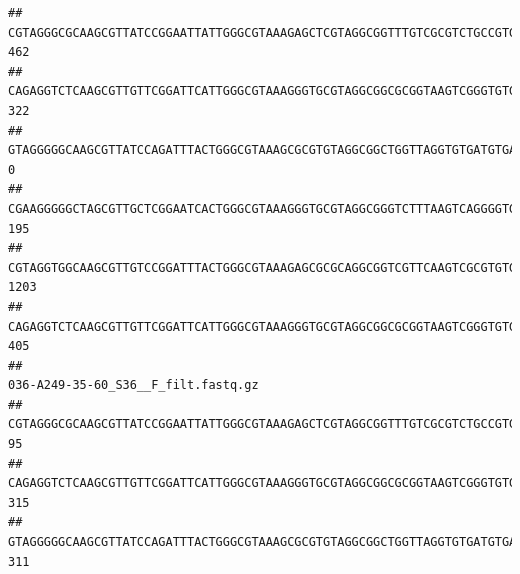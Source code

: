 \documentclass[]{article}
\begin{document}
\begin{verbatim}
## CGTAGGGCGCAAGCGTTATCCGGAATTATTGGGCGTAAAGAGCTCGTAGGCGGTTTGTCGCGTCTGCCGTGAAAGTCCGGGGCTCAACTCCGGATCTGCGGTGGGTACGGGCAGACTAGAGTGATGTAGGGGAGACTGGAATTCCTGGTGTAGCGGTGAAATGCGCAGATATCAGGAGGAACACCGATGGCGAAGGCAGGTCTCTGGGCATTAACTGACGCTGAGGAGCGAAAGCATGGGGAGCGAACA                                462
## CAGAGGTCTCAAGCGTTGTTCGGATTCATTGGGCGTAAAGGGTGCGTAGGCGGCGCGGTAAGTCGGGTGTGAAATCTCGGAGCTTAACTCCGAAACTGCATTCGATACTGCCGTGCTTGAGGACTGGAGAGGAGACTGGAATTTACGGTGTAGCGGTGAAATGCGTAGATATCGTAAGGAAGACCAGTGGCGAAGGCGGGTCTCTGGACAGTTCCTGACGCTGAGGCACGAAGGCCAGGGGAGCAAACG                                322
## GTAGGGGGCAAGCGTTATCCAGATTTACTGGGCGTAAAGCGCGTGTAGGCGGCTGGTTAGGTGTGATGTGAAATCTTCCGGCTCAACCGGAAAACTGCATTGCAAACCGGCCTGGCTAGAGTGCAGGAGAGGGAAGCGGAATTCCAGGTGTAGCGGTGAAATGCGTAGATATCTGGAGGAACACCAGTGGCGAAGGCGGCTTCCTGGCCTGCAACTGACGCTGAGACGCGAAAGCGTGGGGAGCGAAC                                   0
## CGAAGGGGGCTAGCGTTGCTCGGAATCACTGGGCGTAAAGGGTGCGTAGGCGGGTCTTTAAGTCAGGGGTGAAATCCTGGAGCTCAACTCCAGAACTGCCTTTGATACTGAAGATCTTGAGTTCGGGAGAGGTGAGTGGAACTGCGAGTGTAGAGGTGAAATTCGTAGATATTCGCAAGAACACCAGTGGCGAAGGCGGCTCACTGGCCCGATACTGACGCTGAGGCACGAAAGCGTGGGGAGCAAACA                                195
## CGTAGGTGGCAAGCGTTGTCCGGATTTACTGGGCGTAAAGAGCGCGCAGGCGGTCGTTCAAGTCGCGTGTGAAAGCCCCCGGCTCAACTGGGGAGGGTCACGCGATACTGATCGACTCGAAGGCAGGAGAGGGTAGTGGAATTCCCGGTGTAGTGGTGAAATGCGTAGATATCGGGAGGAACACCAGTGGCGAAGGCGACTACCTGGCCTGTTCTTGACGCTGAGGCGCGAAAGCTAGGGGAGCAAACG                               1203
## CAGAGGTCTCAAGCGTTGTTCGGATTCATTGGGCGTAAAGGGTGCGTAGGCGGCGCGGTAAGTCGGGTGTGAAATCTCGGGGCTTAACTCCGAAACTGCATTCGATACTGCCGTGCTTGAGGACTGGAGAGGAGACTGGAATTTACGGTGTAGCGGTGAAATGCGTAGATATCGTAAGGAAGACCAGTGGCGAAGGCGGGTCTCTGGACAGTTCCTGACGCTGAGGCACGAAGGCCAGGGGAGCAAACG                                405
##                                                                                                                                                                                                                                                           036-A249-35-60_S36__F_filt.fastq.gz
## CGTAGGGCGCAAGCGTTATCCGGAATTATTGGGCGTAAAGAGCTCGTAGGCGGTTTGTCGCGTCTGCCGTGAAAGTCCGGGGCTCAACTCCGGATCTGCGGTGGGTACGGGCAGACTAGAGTGATGTAGGGGAGACTGGAATTCCTGGTGTAGCGGTGAAATGCGCAGATATCAGGAGGAACACCGATGGCGAAGGCAGGTCTCTGGGCATTAACTGACGCTGAGGAGCGAAAGCATGGGGAGCGAACA                                  95
## CAGAGGTCTCAAGCGTTGTTCGGATTCATTGGGCGTAAAGGGTGCGTAGGCGGCGCGGTAAGTCGGGTGTGAAATCTCGGAGCTTAACTCCGAAACTGCATTCGATACTGCCGTGCTTGAGGACTGGAGAGGAGACTGGAATTTACGGTGTAGCGGTGAAATGCGTAGATATCGTAAGGAAGACCAGTGGCGAAGGCGGGTCTCTGGACAGTTCCTGACGCTGAGGCACGAAGGCCAGGGGAGCAAACG                                 315
## GTAGGGGGCAAGCGTTATCCAGATTTACTGGGCGTAAAGCGCGTGTAGGCGGCTGGTTAGGTGTGATGTGAAATCTTCCGGCTCAACCGGAAAACTGCATTGCAAACCGGCCTGGCTAGAGTGCAGGAGAGGGAAGCGGAATTCCAGGTGTAGCGGTGAAATGCGTAGATATCTGGAGGAACACCAGTGGCGAAGGCGGCTTCCTGGCCTGCAACTGACGCTGAGACGCGAAAGCGTGGGGAGCGAAC                                  311

\end{verbatim}
\end{document}
